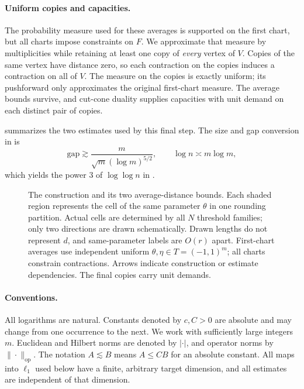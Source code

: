 \documentclass[11pt]{article}
\numberwithin{equation}{section}
\theoremstyle{definition}
\theoremstyle{remark}
\newcommand{\op}{\mathrm{op}}
\begin{document}
\paragraph{Uniform copies and capacities.}
The probability measure used for these averages is supported on the
first chart, but all charts impose constraints on $F$. We approximate
that measure by multiplicities while retaining at least one copy of
\emph{every} vertex of $V$. Copies of the same vertex have distance zero,
so each contraction on the copies induces a contraction on all of $V$.
The measure on the copies is exactly uniform; its pushforward only
approximates the original first-chart measure. The average bounds survive, and cut-cone duality supplies capacities
with unit demand on each distinct pair of copies.

 summarizes the two estimates used by this final
step. The size and gap conversion in  is
\[
 \mathrm{gap}\gtrsim\frac{m}{\sqrt m(\log m)^{5/2}},
 \qquad \log n\asymp m\log m,
\]
which yields the power $3$ of $\log\log n$ in .

\begin{figure}[tbp]
\centering

\caption{The construction and its two average-distance bounds.
Each shaded region represents the cell of the same parameter $\theta$ in
one rounding partition. Actual cells are determined by all $N$ threshold
families; only two directions are drawn schematically. Drawn lengths do
not represent $d$, and same-parameter labels are $O(r)$ apart.
First-chart averages use independent uniform $\theta,\eta\in T=(-1,1)^m$;
all charts constrain contractions. Arrows indicate construction or
estimate dependencies. The final copies carry unit demands.}
\label{fig:construction}
\end{figure}

\paragraph{Conventions.}
All logarithms are natural. Constants denoted by $c,C>0$ are absolute
and may change from one occurrence to the next. We work with
sufficiently large integers $m$. Euclidean and Hilbert norms are
denoted by $|\cdot|$, and operator norms by $\|\cdot\|_{\op}$.
The notation $A\lesssim B$ means $A\le CB$ for an absolute constant.
All maps into $\ell_1$ used below have a finite, arbitrary target
dimension, and all estimates are independent of that dimension.








\appendix




\end{document}
